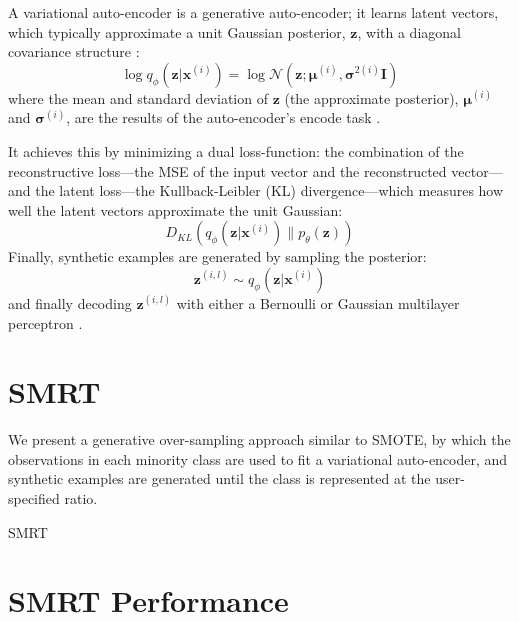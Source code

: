 \documentclass[twoside,11pt]{article}
\begin{document}
A variational auto-encoder is a generative auto-encoder; it learns latent vectors, which typically approximate a unit Gaussian posterior, $\mathbf{z}$, with a diagonal covariance structure \citep{kingma2013auto}:
\[
    \log q_{\phi}(\mathbf{z}|\mathbf{x}^{(i)}) = \log \mathcal{N}(\mathbf{z}; \bm{\mu}^{(i)}, \bm{\sigma}^{2(i)}\mathbf{I})
\]
where the mean and standard deviation of $\mathbf{z}$ (the approximate posterior), $\bm{\mu}^{(i)}$ and $\bm{\sigma}^{(i)}$, are the results of the auto-encoder's encode task \citep{kingma2013auto}.

It achieves this by minimizing a dual loss-function: the combination of the reconstructive loss---the MSE of the input vector and the reconstructed vector---and the latent loss---the Kullback-Leibler (KL) divergence---which measures how well the latent vectors approximate the unit Gaussian:
\[
    D_{KL}(q_{\phi}(\mathbf{z}|\mathbf{x}^{(i)})\parallel p_{\theta}(\mathbf{z}))
\]
Finally, synthetic examples are generated by sampling the posterior:
\[
    \mathbf{z}^{(i,l)} \sim q_{\phi}(\mathbf{z}|\mathbf{x}^{(i)})
\]
and finally decoding $\mathbf{z}^{(i,l)}$ with either a Bernoulli or Gaussian multilayer perceptron \citep{kingma2013auto}.


\section{SMRT}

We present a generative over-sampling approach similar to SMOTE, by which the observations in each minority class are used to fit a variational auto-encoder, and synthetic examples are generated until the class is represented at the user-specified ratio. \\

\makeatletter
\def\BState{\State\hskip-\ALG@thistlm}
\makeatother

\begin{algorithm}
\caption{SMRT}\label{smrt}
\end{algorithm}

\section{SMRT Performance}


\newpage

\end{document}
